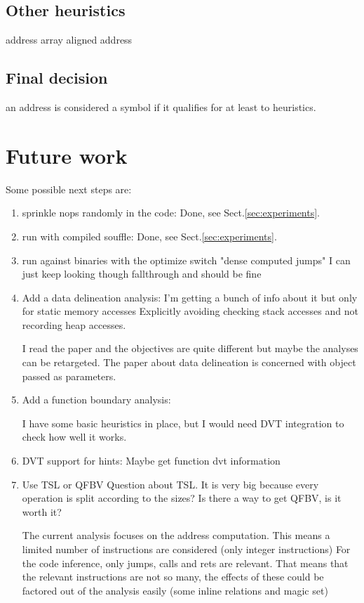 \documentclass[]{llncs}
\begin{document}
\subsection{Other heuristics}

address array
aligned address

\subsection{Final decision}
an address is considered a symbol if it qualifies for at least to heuristics.


\section{Future work}

  Some possible next steps are:
  \begin{enumerate}
  \item sprinkle nops randomly in the code:
    Done, see Sect.\ref{sec:experiments}.
  \item run with compiled souffle:
    Done, see Sect.\ref{sec:experiments}.
  \item run against binaries with the optimize switch "dense computed jumps"
    I can just keep looking though fallthrough and should be fine

  \item Add a data delineation analysis:
    I'm getting a bunch of info about it but only for static memory accesses
    Explicitly avoiding checking stack accesses and not recording heap accesses.
    
    I read the paper and the objectives are quite different but maybe the analyses
    can be retargeted. The paper about data delineation is concerned with object
    passed as parameters.

  \item Add a function boundary analysis:

    I have some basic heuristics in place, but I would need DVT integration
    to check how well it works.

  \item DVT support for hints:
    Maybe get function dvt information
  \item Use TSL or QFBV
    Question about TSL. It is very big because every operation is split according to
    the sizes? Is there a way to get QFBV, is it worth it?

    The current analysis focuses on the address computation. This means a limited number
    of instructions are considered (only integer instructions)
    For the code inference, only jumps, calls and rets are relevant.
    That means that the relevant instructions are not so many, the effects of these could
    be factored out of the analysis easily (some inline relations and magic set)

  \end{enumerate}
\end{document}
